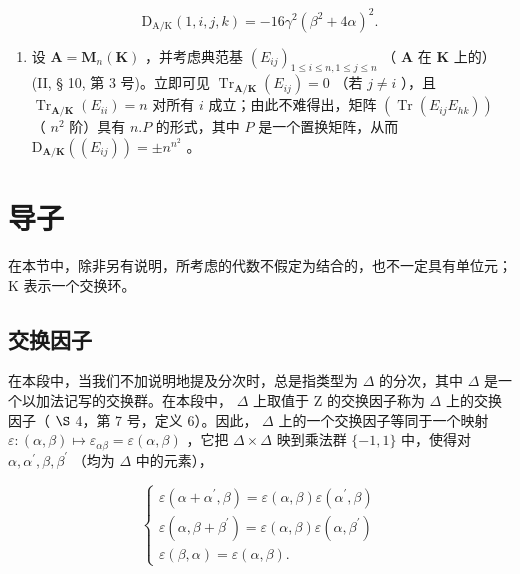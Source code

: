\[
\mathrm{D} _ {\mathrm{A/K}} (1, i, j, k) = - 16 \gamma^ {2} (\beta^ {2} + 4 \alpha) ^ {2}.
\]

\begin{enumerate}
\def\labelenumi{(\arabic{enumi})}
\setcounter{enumi}{3}
\tightlist
\item
  设 \(\mathbf{A} = \mathbf{M}_n(\mathbf{K})\) ，并考虑典范基 \((E_{ij})_{1\leqslant i\leqslant n,1\leqslant j\leqslant n}\) （ \(\mathbf{A}\) 在 \(\mathbf{K}\) 上的）(II, § 10, 第 3 号)。立即可见 \(\operatorname{Tr}_{\mathbf{A} / \mathbf{K}}(E_{ij}) = 0\) （若 \(j\neq i\) ），且 \(\operatorname{Tr}_{\mathbf{A} / \mathbf{K}}(E_{ii}) = n\) 对所有 \(i\) 成立；由此不难得出，矩阵 \((\operatorname{Tr}(E_{ij}E_{hk}))\) （ \(n^2\) 阶）具有 \(n.P\) 的形式，其中 \(P\) 是一个置换矩阵，从而 \(\mathrm{D}_{\mathbf{A} / \mathbf{K}}((E_{ij})) = \pm n^{n^2}\) 。
\end{enumerate}

\section{导子}

在本节中，除非另有说明，所考虑的代数不假定为结合的，也不一定具有单位元；K 表示一个交换环。

\subsection{交换因子}

在本段中，当我们不加说明地提及分次时，总是指类型为 \(\Delta\) 的分次，其中 \(\Delta\) 是一个以加法记写的交换群。在本段中， \(\Delta\) 上取值于 Z 的交换因子称为 \(\Delta\) 上的交换因子（ \(\S\) 4，第 7 号，定义 6）。因此， \(\Delta\) 上的一个交换因子等同于一个映射 \(\varepsilon\colon(\alpha,\beta)\mapsto\varepsilon_{\alpha\beta}=\varepsilon(\alpha,\beta)\) ，它把 \(\Delta\times\Delta\) 映到乘法群 \(\{-1,1\}\) 中，使得对 \(\alpha,\alpha^{\prime},\beta,\beta^{\prime}\) （均为 \(\Delta\) 中的元素），

\[
\left\{ \begin{array}{l} \varepsilon (\alpha + \alpha^ {\prime}, \beta) = \varepsilon (\alpha , \beta) \varepsilon (\alpha^ {\prime}, \beta) \\ \varepsilon (\alpha , \beta + \beta^ {\prime}) = \varepsilon (\alpha , \beta) \varepsilon (\alpha , \beta^ {\prime}) \\ \varepsilon (\beta , \alpha) = \varepsilon (\alpha , \beta). \end{array} \right.\tag{1}
\]

